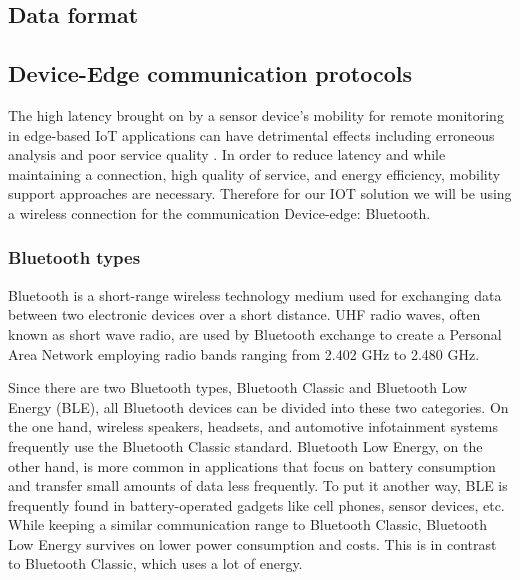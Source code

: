 \subsection{Data format}

\subsection{Device-Edge communication protocols}
The high latency brought on by a sensor device's mobility for remote monitoring in edge-based IoT applications can have detrimental effects including erroneous analysis and poor service quality \cite{b5}. In order to reduce latency and while maintaining a connection, high quality of service, and energy efficiency, mobility support approaches are necessary. Therefore for our IOT solution we will be using a wireless connection for the communication Device-edge: Bluetooth. 
\subsubsection{Bluetooth types}
Bluetooth is a short-range wireless technology medium used for exchanging data between two electronic devices over a short distance. 
UHF radio waves, often known as short wave radio, are used by Bluetooth exchange to create a Personal Area Network employing radio bands ranging from 2.402 GHz to 2.480 GHz.

Since there are two Bluetooth types, Bluetooth Classic and Bluetooth Low Energy (BLE), all Bluetooth devices can be divided into these two categories. On the one hand, wireless speakers, headsets, and automotive infotainment systems frequently use the Bluetooth Classic standard. Bluetooth Low Energy, on the other hand, is more common in applications that focus on battery consumption and transfer small amounts of data less frequently. To put it another way, BLE is frequently found in battery-operated gadgets like cell phones, sensor devices, etc. While keeping a similar communication range to Bluetooth Classic, Bluetooth Low Energy survives on lower power consumption and costs. This is in contrast to Bluetooth Classic, which uses a lot of energy.


